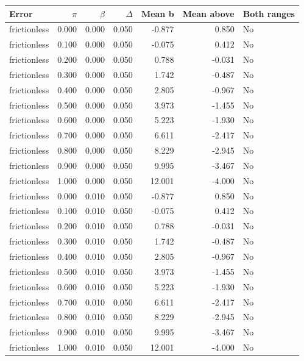 \begin{tabular}{lrrrrrl}
\toprule
Error & $\pi$ & $\beta$ & $\Delta$ & Mean b & Mean above & Both ranges \\
\midrule
frictionless & 0.000 & 0.000 & 0.050 & -0.877 & 0.850 & No \\
frictionless & 0.100 & 0.000 & 0.050 & -0.075 & 0.412 & No \\
frictionless & 0.200 & 0.000 & 0.050 & 0.788 & -0.031 & No \\
frictionless & 0.300 & 0.000 & 0.050 & 1.742 & -0.487 & No \\
frictionless & 0.400 & 0.000 & 0.050 & 2.805 & -0.967 & No \\
frictionless & 0.500 & 0.000 & 0.050 & 3.973 & -1.455 & No \\
frictionless & 0.600 & 0.000 & 0.050 & 5.223 & -1.930 & No \\
frictionless & 0.700 & 0.000 & 0.050 & 6.611 & -2.417 & No \\
frictionless & 0.800 & 0.000 & 0.050 & 8.229 & -2.945 & No \\
frictionless & 0.900 & 0.000 & 0.050 & 9.995 & -3.467 & No \\
frictionless & 1.000 & 0.000 & 0.050 & 12.001 & -4.000 & No \\
frictionless & 0.000 & 0.010 & 0.050 & -0.877 & 0.850 & No \\
frictionless & 0.100 & 0.010 & 0.050 & -0.075 & 0.412 & No \\
frictionless & 0.200 & 0.010 & 0.050 & 0.788 & -0.031 & No \\
frictionless & 0.300 & 0.010 & 0.050 & 1.742 & -0.487 & No \\
frictionless & 0.400 & 0.010 & 0.050 & 2.805 & -0.967 & No \\
frictionless & 0.500 & 0.010 & 0.050 & 3.973 & -1.455 & No \\
frictionless & 0.600 & 0.010 & 0.050 & 5.223 & -1.930 & No \\
frictionless & 0.700 & 0.010 & 0.050 & 6.611 & -2.417 & No \\
frictionless & 0.800 & 0.010 & 0.050 & 8.229 & -2.945 & No \\
frictionless & 0.900 & 0.010 & 0.050 & 9.995 & -3.467 & No \\
frictionless & 1.000 & 0.010 & 0.050 & 12.001 & -4.000 & No \\
\bottomrule
\end{tabular}
\par\medskip
